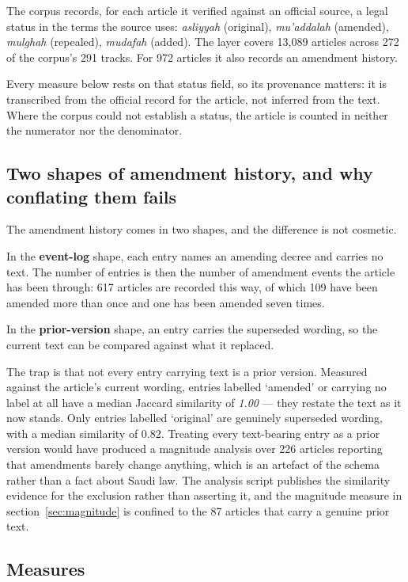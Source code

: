 \documentclass[11pt]{article}
\begin{document}
The corpus records, for each article it verified against an official source, a
legal status in the terms the source uses: \emph{asliyyah} (original),
\emph{mu'addalah} (amended), \emph{mulghah} (repealed), \emph{mudafah}
(added). The layer covers 13,089 articles across 272 of the corpus's 291
tracks. For 972 articles it also records an amendment history.

Every measure below rests on that status field, so its provenance matters: it
is transcribed from the official record for the article, not inferred from the
text. Where the corpus could not establish a status, the article is counted in
neither the numerator nor the denominator.

\subsection{Two shapes of amendment history, and why conflating them fails}

The amendment history comes in two shapes, and the difference is not
cosmetic.

In the \textbf{event-log} shape, each entry names an amending decree and
carries no text. The number of entries is then the number of amendment events
the article has been through: 617 articles are recorded this way, of which 109
have been amended more than once and one has been amended seven times.

In the \textbf{prior-version} shape, an entry carries the superseded wording,
so the current text can be compared against what it replaced.

The trap is that not every entry carrying text is a prior version. Measured
against the article's current wording, entries labelled `amended' or carrying
no label at all have a median Jaccard similarity of \emph{1.00} --- they
restate the text as it now stands. Only entries labelled `original' are
genuinely superseded wording, with a median similarity of 0.82. Treating every
text-bearing entry as a prior version would have produced a magnitude analysis
over 226 articles reporting that amendments barely change anything, which is
an artefact of the schema rather than a fact about Saudi law. The analysis
script publishes the similarity evidence for the exclusion rather than
asserting it, and the magnitude measure in section~\ref{sec:magnitude} is
confined to the 87 articles that carry a genuine prior text.

\subsection{Measures}
\end{document}
